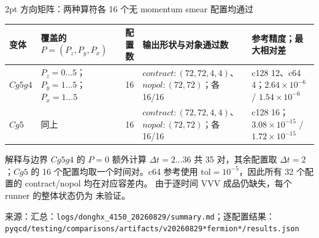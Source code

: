 \documentclass[UTF8,aspectratio=169,11pt]{ctexbeamer}
\newcommand{\source}[1]{\vspace{0.05em}\par{\raggedright\scriptsize\color{muted}来源：#1\par}}
\newcommand{\codepath}[1]{\nolinkurl{#1}}
\newcommand{\unverified}{\textcolor{warning}{未验证}}
\begin{document}
\begin{frame}[t]{2pt 方向矩阵：两种算符各 16 个无 momentum smear 配置均通过}
  \footnotesize
  \renewcommand{\arraystretch}{1.08}
  \begin{tabularx}{0.96\textwidth}{@{}L Y r Y Y@{}}
    \toprule
    变体 & 覆盖的 $P=(P_z,P_y,P_x)$ & 配置数 & 输出形状与对象通过数 & 参考精度；最大相对差\\
    \midrule
    $Cg5g4$ & $P_z=0\ldots5$；$P_y=1\ldots5$；$P_x=1\ldots5$ & 16 &
      $contract:(72,72,4,4)$、$nopol:(72,72)$；各 16/16 &
      c128 12、c64 4；$2.64\times10^{-6}$ / $1.54\times10^{-6}$\\
    $Cg5$ & 同上 & 16 &
      $contract:(72,72,4,4)$、$nopol:(72,72)$；各 16/16 &
      c128 16；$3.08\times10^{-15}$ / $1.72\times10^{-15}$\\
    \bottomrule
  \end{tabularx}
  \vspace{0.12em}
  \begin{block}{解释与边界}
    $Cg5g4$ 的 $P=0$ 额外计算 $\Delta t=2\ldots36$ 共 35 对，其余配置取
    $\Delta t=2$；$Cg5$ 的 16 个配置均取一个时间对。c64 参考使用
    $\mathrm{tol}=10^{-5}$，因此所有 32 个配置的 contract/nopol 均在对应容差内。
    由于逐时间 VVV 成品仍缺失，每个 runner 的整体状态仍为 \unverified。
  \end{block}
  \source{汇总：\codepath{logs/donghx_4150_20260829/summary.md}；逐配置结果：\codepath{pyqcd/testing/comparisons/artifacts/v20260829*fermion*/results.json}}
\end{frame}
\end{document}

